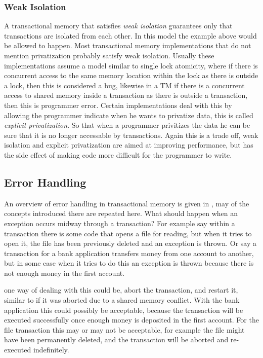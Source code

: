 \subsubsection{Weak Isolation}
A transactional memory that satisfies \emph{weak isolation} guarantees only that transactions are isolated from each other.  In this model the example above would be allowed to happen.
Most transactional memory implementations that do not mention privatization probably satisfy weak isolation.
Usually these implementations assume a model similar to single lock atomicity, where if there is concurrent access to the same memory location within the lock as there is outside a lock, then this is considered a bug, likewise in a TM if there is a concurrent access to shared memory inside a transaction as there is outside a transaction, then this is programmer error.
Certain implementations deal with this by allowing the programmer indicate when he wants to privatize data, this is called \emph{explicit privatization}.
So that when a programmer privitizes the data he can be sure that it is no longer accessable by transactions.
Again this is a trade off, weak isolation and explicit privatization are aimed at improving performance, but has the side effect of making code more difficult for the programmer to write.


\subsection{Error Handling}
An overview of error handling in transactional memory is given in \cite{1360456}, may of the concepts introduced there are repeated here.
What should happen when an exception occurs midway through a transaction?
For example say within a transaction there is some code that opens a file for reading, but when it tries to open it, the file has been previously deleted and an exception is thrown.
Or say a transaction for a bank application transfers money from one account to another, but in some case when it tries to do this an exception is thrown because there is not enough money in the first account.

one way of dealing with this could be, abort the transaction, and restart it, similar to if it was aborted due to a shared memory conflict.
With the bank application this could possibly be acceptable, because the transaction will be executed successfully once enough money is deposited in the first account.
For the file transaction this may or may not be acceptable, for example the file might have been permanently deleted, and the transaction will be aborted and re-executed indefinitely.

